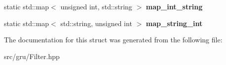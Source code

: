 \begin{DoxyCompactItemize}
\item 
\hypertarget{structgru_1_1Filter_1_1Filter_aee748f62031267972e56a479a9a96cf6}{static std\-::map$<$ unsigned int, \*
std\-::string $>$ {\bfseries map\-\_\-int\-\_\-string}}\label{structgru_1_1Filter_1_1Filter_aee748f62031267972e56a479a9a96cf6}

\item 
\hypertarget{structgru_1_1Filter_1_1Filter_a40fdc4368754453e302da8c284f0907d}{static std\-::map$<$ std\-::string, \*
unsigned int $>$ {\bfseries map\-\_\-string\-\_\-int}}\label{structgru_1_1Filter_1_1Filter_a40fdc4368754453e302da8c284f0907d}

\end{DoxyCompactItemize}


\-The documentation for this struct was generated from the following file\-:\begin{DoxyCompactItemize}
\item 
src/gru/\-Filter.\-hpp\end{DoxyCompactItemize}
